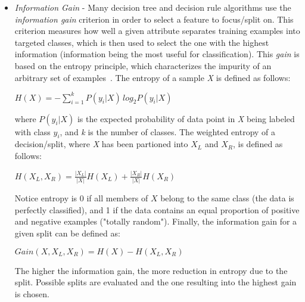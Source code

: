 \begin{itemize}
\item \textit{Information Gain} - Many decision tree and decision rule algorithms use the \textit{information gain} criterion in order to select a feature to focus/split on.  This criterion measures how well a given attribute separates training examples into targeted classes, which is then used to select the one with the highest information (information being the most useful for classification). This \textit{gain} is based on the entropy principle, which characterizes the impurity of an arbitrary set of examples~\cite{gini-ig}.  The entropy of a sample \textit{X} is defined as follows:
\begin{center}\( H(X)= -\sum_{i=1}^k {P(y_i|X)\,log_2 P(y_i|X)}\)\end{center}
where \(P(y_i|X)\) is the expected probability of data point in \textit{X} being labeled with class \(y_i\), and \textit{k} is the number of classes.  The weighted entropy of a decision/split, where \textit{X} has been partioned into \(X_L\) and \(X_R\), is defined as follows:
\begin{center}\(H(X_L,X_R)= \frac{|X_{L}|}{|X|} H(X_L) + \frac{|X_{R}|}{|X|} H(X_R)\)\end{center}
Notice entropy is 0 if all members of \(X\) belong to the same class (the data is perfectly classified), and 1 if the data contains an equal proportion of positive and negative examples ("totally random"). Finally, the information gain for a given split can be defined as:
\begin{center}\( Gain(X,X_{L},X_{R})= H(X)-H(X_{L},X_{R})\)\end{center}
The higher the information gain, the more reduction in entropy due to the split.  Possible splits are evaluated and the one resulting into the highest gain is chosen.


\end{itemize}
